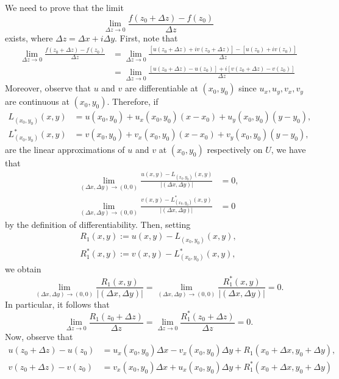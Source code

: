 \documentclass[10pt]{article}
\makeatletter
\theoremstyle{newstyle}
\newenvironment{pf}[1][\proofname]{\par
  \pushQED{\qed}%
  \normalfont \topsep0\p@\relax
  \trivlist
  \item[\hskip\labelsep\scshape
  #1\@addpunct{.}]\ignorespaces
}{%
  \popQED\endtrivlist\@endpefalse
}
\makeatother
\begin{document}
\begin{pf}
We need to prove that the limit 
\[ \lim_{\Delta z \to 0} \frac{f(z_0 + \Delta z) - f(z_0)}{\Delta z} \]
exists, where $\Delta z = \Delta x + i\Delta y$. First, note that 
\begin{align*}
    \lim_{\Delta z \to 0} \frac{f(z_0 + \Delta z) - f(z_0)}{\Delta z}
    &= \lim_{\Delta z \to 0} \frac{[u(z_0 + \Delta z) + iv(z_0 + \Delta z)] - [u(z_0) + iv(z_0)]}{\Delta z} \\
    &= \lim_{\Delta z \to 0} \frac{[u(z_0 + \Delta z) - u(z_0)] + i[v(z_0 + \Delta z) - v(z_0)]}{\Delta z}
\end{align*}
Moreover, observe that $u$ and $v$ are differentiable at $(x_0, y_0)$ since $u_x, u_y, v_x, v_y$ are 
continuous at $(x_0, y_0)$. Therefore, if 
\begin{align*}
    L_{(x_0, y_0)}(x, y) &= u(x_0, y_0) + u_x(x_0, y_0)(x - x_0) + u_y(x_0, y_0)(y - y_0), \\
    L^*_{(x_0, y_0)}(x, y) &= v(x_0, y_0) + v_x(x_0, y_0)(x - x_0) + v_y(x_0, y_0)(y - y_0),
\end{align*}
are the linear approximations of $u$ and $v$ at $(x_0, y_0)$ respectively on $U$, we have that 
\begin{align*}
    \lim_{(\Delta x, \Delta y) \to (0, 0)} \frac{u(x, y) - L_{(x_0, y_0)}(x, y)}{|(\Delta x, \Delta y)|}
    & = 0, \\
    \lim_{(\Delta x, \Delta y) \to (0, 0)} \frac{v(x, y) - L^*_{(x_0, y_0)}(x, y)}{|(\Delta x, \Delta y)|}
    & = 0
\end{align*}
by the definition of differentiability. Then, setting 
\begin{align*}
    R_1(x, y) := u(x, y) - L_{(x_0, y_0)}(x, y), \\
    R^*_1(x, y) := v(x, y) - L^*_{(x_0, y_0)}(x, y), 
\end{align*}
we obtain 
\[ \lim_{(\Delta x, \Delta y) \to (0, 0)} \frac{R_1(x, y)}{|(\Delta x, \Delta y)|}
= \lim_{(\Delta x, \Delta y) \to (0, 0)} \frac{R^*_1(x, y)}{|(\Delta x, \Delta y)|} = 0. \]
In particular, it follows that 
\[ \lim_{\Delta z \to 0} \frac{R_1(z_0 + \Delta z)}{\Delta z}
= \lim_{\Delta z \to 0} \frac{R^*_1(z_0 + \Delta z)}{\Delta z} = 0. \]
Now, observe that 
\begin{align*}
    u(z_0 + \Delta z) - u(z_0) 
    &= u_x(x_0, y_0) \Delta x - v_x(x_0, y_0)\Delta y + R_1(x_0 + \Delta x, y_0 + \Delta y), \\
    v(z_0 + \Delta z) - v(z_0) 
    &= v_x(x_0, y_0) \Delta x + u_x(x_0, y_0)\Delta y + R^*_1(x_0 + \Delta x, y_0 + \Delta y)

\end{align*}
\end{pf}
\end{document}

